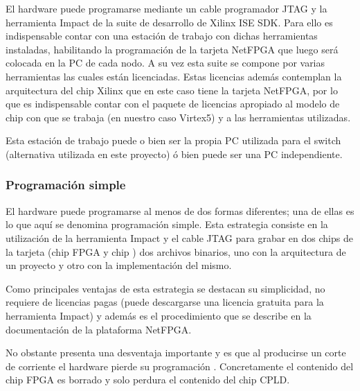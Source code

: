 El hardware puede programarse mediante un cable programador JTAG y la herramienta Impact de la suite de desarrollo de Xilinx ISE SDK. Para ello es indispensable contar con una estaci\'on de trabajo con dichas herramientas instaladas, habilitando la programaci\'on  de la tarjeta NetFPGA que luego ser\'a colocada en la PC de cada nodo. A su vez esta suite se compone por varias herramientas las cuales están licenciadas. Estas licencias adem\'as contemplan la arquitectura del chip Xilinx que en este caso tiene la tarjeta NetFPGA, por lo que es indispensable contar con el paquete de licencias apropiado al modelo de chip con que se trabaja (en nuestro caso Virtex5) y a las herramientas utilizadas. 

Esta estaci\'on de trabajo puede o bien ser la propia PC utilizada para el switch (alternativa utilizada en este proyecto) \'o bien puede ser una PC independiente.


\subsubsection{Programaci\'on simple}
El hardware puede programarse al menos de dos formas diferentes; una de ellas es lo que aqu\'i se denomina programaci\'on simple. Esta estrategia consiste en la utilizaci\'on de la herramienta Impact y el cable JTAG para grabar en dos chips de la tarjeta (chip FPGA y chip ) dos archivos binarios, uno con la arquitectura de un proyecto y otro con la implementaci\'on del mismo.

Como principales ventajas de esta estrategia se destacan su simplicidad, no requiere de licencias pagas (puede descargarse una licencia gratuita para la herramienta Impact) y adem\'as es el procedimiento que se describe en la documentaci\'on de la plataforma NetFPGA.

No obstante presenta una desventaja importante y es que al producirse un corte de corriente el hardware pierde su programación . Concretamente el contenido del chip FPGA es borrado y solo perdura el contenido del chip CPLD.\\


